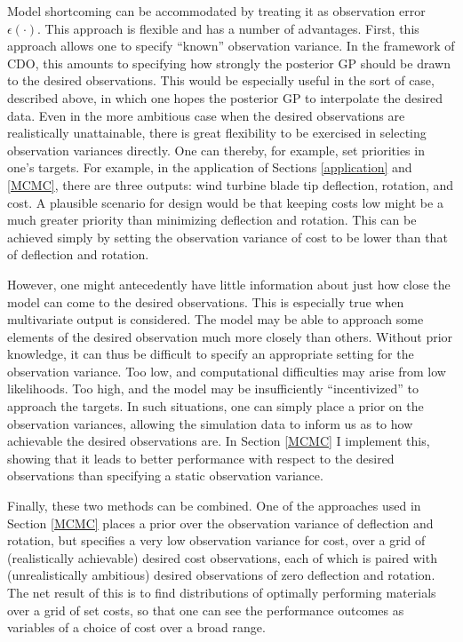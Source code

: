 \documentclass{article}
\begin{document}
Model shortcoming can be accommodated by treating it as observation error $\epsilon(\cdot)$. This approach is flexible and has a number of advantages.
First, this approach allows one to specify ``known'' observation variance. In the framework of CDO, this amounts to specifying how strongly the posterior GP should be drawn to the desired observations. This would be especially useful in the sort of case, described above, in which one hopes the posterior GP to interpolate the desired data. Even in the more ambitious case when the desired observations are realistically unattainable, there is great flexibility to be exercised in selecting observation variances directly. One can thereby, for example, set priorities in one's targets. For example, in the application of Sections \ref{application} and \ref{MCMC}, there are three outputs: wind turbine blade tip deflection, rotation, and cost. A plausible scenario for design would be that keeping costs low might be a much greater priority than minimizing deflection and rotation. This can be achieved simply by setting the observation variance of cost to be lower than that of deflection and rotation. 

However, one might antecedently have little information about just how close the model can come to the desired observations. This is especially true when multivariate output is considered. The model may be able to approach some elements of the desired observation much more closely than others. Without prior knowledge, it can thus be difficult to specify an appropriate setting for the observation variance. Too low, and computational difficulties may arise from low likelihoods. Too high, and the model may be insufficiently ``incentivized'' to approach the targets. In such situations, one can simply place a prior on the observation variances, allowing the simulation data to inform us as to how achievable the desired observations are. In Section \ref{MCMC} I implement this, showing that it leads to better performance with respect to the desired observations than specifying a static observation variance.

Finally, these two methods can be combined. One of the approaches used in Section \ref{MCMC} places a prior over the observation variance of deflection and rotation, but specifies a very low observation variance for cost, over a grid of (realistically achievable) desired cost observations, each of which is paired with (unrealistically ambitious) desired observations of zero deflection and rotation. The net result of this is to find distributions of optimally performing materials over a grid of set costs, so that one can see the performance outcomes as variables of a choice of cost over a broad range.
\end{document}

